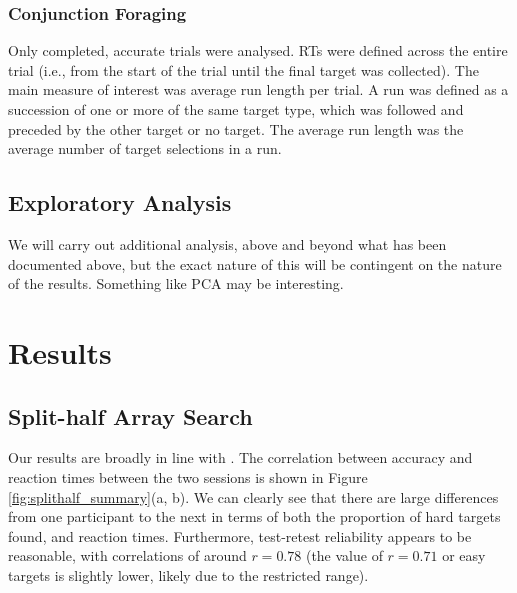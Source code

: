 \documentclass[]{rsos}%
\begin{document}
\subsubsection{Conjunction Foraging}

Only completed, accurate trials were analysed. RTs were defined across the entire trial (i.e., from the start of the trial until the final target was collected). The main measure of interest was average run length per trial. A run was defined as a succession of one or more of the same target type, which was followed and preceded by the other target or no target. The average run length was the average number of target selections in a run. 

\subsection{Exploratory Analysis}

We will carry out additional analysis, above and beyond what has been documented above, but the exact nature of this will be contingent on the nature of the results. Something like PCA may be interesting. 

\section{Results}

\subsection{Split-half Array Search}
Our results are broadly in line with \cite{nowakowsak2017}. The correlation between accuracy and reaction times between the two sessions is shown in Figure \ref{fig:splithalf_summary}(a, b). We can clearly see that there are large differences from one participant to the next in terms of both the proportion of hard targets found, and reaction times. Furthermore, test-retest reliability appears to be reasonable, with correlations of around $r = 0.78$ (the value of $r = 0.71$ or easy targets is slightly lower, likely due to the restricted range).
\end{document}
